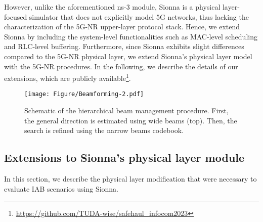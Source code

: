 However, unlike the aforementioned ns-3 module, Sionna is a physical layer-focused simulator that does not explicitly model 5G networks, thus lacking  the characterization of the 5G-NR upper-layer protocol stack. Hence, we extend Sionna by including the system-level functionalities such as MAC-level scheduling and RLC-level buffering. Furthermore, since Sionna exhibits slight differences compared to the 5G-NR physical layer, we extend Sionna's physical layer model~\cite{hoydis2022sionna} with the 5G-NR procedures. In the following, we describe the details of our extensions, which are publicly available\footnote{\url{https://github.com/TUDA-wise/safehaul_infocom2023}}.


\begin{figure}[t!]
    \centering
    \texttt{[image: Figure/Beamforming-2.pdf]}
      \caption{Schematic of the hierarchical beam management procedure. First, the general direction is estimated using wide beams (top). Then, the search is refined using the narrow beams codebook.}
      \label{fig:beamforming}
      \vspace{-5mm}
\end{figure}



\subsection{Extensions to Sionna's physical layer module}
\label{sub:additionalSionna}
In this section, we describe the physical layer modification that were necessary to evaluate IAB scenarios using Sionna. 




